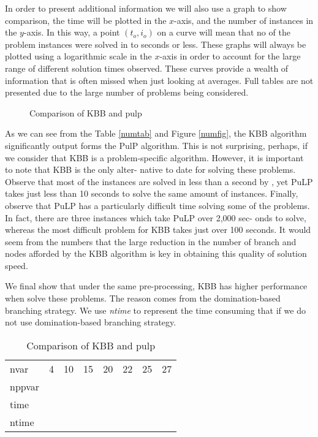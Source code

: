 \documentclass[a4paper,11pt]{article}
\begin{document}
In order to present additional information we will also use a graph to show comparison, the time will be plotted in the $x$-axis, and the number of instances in the $y$-axis. In this way, a point $(t_o,i_o)$ on a curve will mean that no of the problem instances were solved in to seconds or less. These graphs will always be plotted using a logarithmic scale in the $x$-axis in order to account for the large range of different solution times observed. These curves provide a wealth of information that is often missed when just looking at averages. Full tables are not presented due to the large number of problems being considered.

\begin{figure}[H]
\begin{center}
\end{center}
\caption{Comparison of KBB and pulp \label{numfigp}}
\end{figure}

As we can see from the Table \ref{numtab} and Figure \ref{numfig}, the KBB algorithm significantly output forms the PulP algorithm. This is not surprising, perhaps, if we consider that KBB is a problem-specific algorithm. However, it is important to note that KBB is the only alter- native to date for solving these problems. Observe that most of the instances are solved in less than a second by , yet PuLP takes just less than 10 seconds to solve the same amount of instances. Finally, observe that PuLP has a particularly difficult time solving some of the problems. In fact, there are three instances which take PuLP over 2,000 sec- onds to solve, whereas the most difficult problem for KBB takes just over 100 seconds. It would seem from the numbers that the large reduction in the number of branch and nodes afforded by the KBB algorithm is key in obtaining this quality of solution speed.

We final show that under the same pre-processing, KBB has higher performance when solve these problems. The reason comes from the domination-based branching strategy. We use \textit{ntime} to represent the time consuming that if we do not use domination-based branching strategy.
\begin{table}[H]
\begin{center}
\begin{tabular}{l c c c c c c c}
\hline
nvar&4&10&15&20&22&25&27\\
nppvar\\
time\\
ntime\\
\hline
\end{tabular}
\end{center}
\caption{Comparison of KBB and pulp\label{numtabd}}
\end{table}
\end{document}
